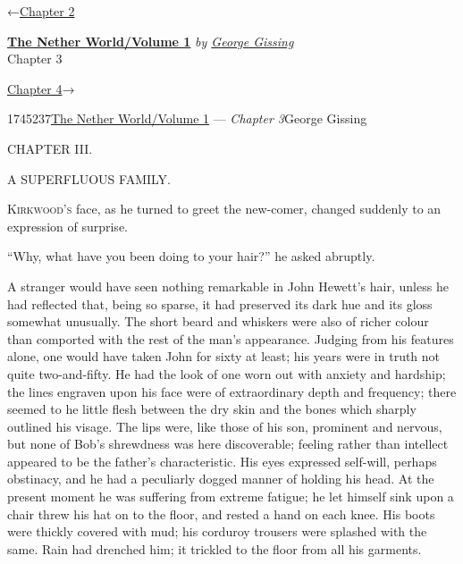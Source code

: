 \hypertarget{headerContainer}{}
\hypertarget{navigationHeader}{}
\protect\hypertarget{headerprevious}{}{←\href{/wiki/The_Nether_World/Volume_1/Chapter_2}{Chapter
2}}

\textbf{\protect\hypertarget{header_title_text}{}{\href{/w/index.php?title=The_Nether_World/Volume_1\&action=edit\&redlink=1}{The
Nether World/Volume 1}}} \emph{by
\href{/wiki/Author:George_Gissing}{\protect\hypertarget{header_author_text}{}{{George
Gissing}}}}\\
\protect\hypertarget{header_section_text}{}{Chapter 3}

\protect\hypertarget{headernext}{}{\href{/wiki/The_Nether_World/Volume_1/Chapter_4}{Chapter
4}→}

\hypertarget{navigationNotes}{}

\hypertarget{ws-data}{}
\protect\hypertarget{ws-article-id}{}{1745237}\protect\hypertarget{ws-title}{}{\href{/w/index.php?title=The_Nether_World/Volume_1\&action=edit\&redlink=1}{The
Nether World/Volume 1} --- \emph{Chapter
3}}\protect\hypertarget{ws-author}{}{George Gissing}

{\protect\hypertarget{45}{}{}}

{CHAPTER III.}

A SUPERFLUOUS FAMILY.

\textsc{Kirkwood's} face, as he turned to greet the new-comer, changed
suddenly to an expression of surprise.

``Why, what have you been doing to your hair?'' he asked abruptly.

A stranger would have seen nothing remarkable in John Hewett's hair,
unless he had reflected that, being so sparse, it had preserved its dark
hue and its gloss somewhat unusually. The short beard and whiskers were
also of richer colour than comported with the rest of the man's
appearance. Judging from his features alone, one would have taken John
for sixty at least; his years were in truth not quite two-and-fifty. He
had the look of one worn out with anxiety
{\protect\hypertarget{46}{}{}}and hardship; the lines engraven upon his
face were of extraordinary depth and frequency; there seemed to he
little flesh between the dry skin and the bones which sharply outlined
his visage. The lips were, like those of his son, prominent and nervous,
but none of Bob's shrewdness was here discoverable; feeling rather than
intellect appeared to be the father's characteristic. His eyes expressed
self-will, perhaps obstinacy, and he had a peculiarly dogged manner of
holding his head. At the present moment he was suffering from extreme
fatigue; he let himself sink upon a chair threw his hat on to the floor,
and rested a hand on each knee. His boots were thickly covered with mud;
his corduroy trousers were splashed with the same. Rain had drenched
him; it trickled to the floor from all his garments.

